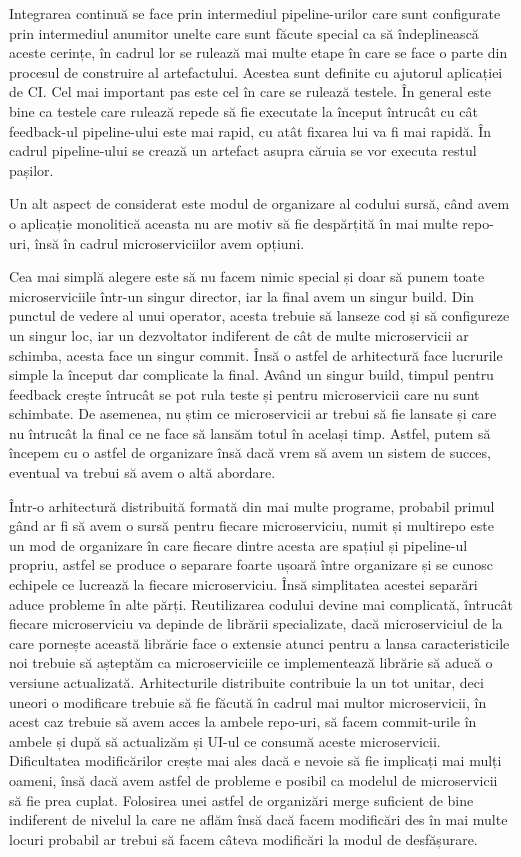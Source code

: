Integrarea continuă se face prin intermediul pipeline-urilor care sunt configurate prin 
intermediul anumitor unelte care sunt făcute special ca să îndeplinească aceste cerințe,
în cadrul lor se rulează mai multe etape în care se face o parte din procesul de construire al
artefactului. Acestea sunt definite cu ajutorul aplicației de CI. Cel mai important pas
este cel în care se rulează testele. În general este bine ca testele care rulează repede
să fie executate la început întrucât cu cât feedback-ul pipeline-ului este mai rapid, cu atât
fixarea lui va fi mai rapidă. În cadrul pipeline-ului se crează un artefact asupra căruia
se vor executa restul pașilor.

Un alt aspect de considerat este modul de organizare al codului sursă, când avem o aplicație
monolitică aceasta nu are motiv să fie despărțită în mai multe repo-uri, însă în cadrul microserviciilor
avem opțiuni.

Cea mai simplă alegere este să nu facem nimic special și doar să punem toate microserviciile
într-un singur director, iar la final avem un singur build. Din punctul de vedere al unui operator,
acesta trebuie să lanseze cod și să configureze un singur loc, iar un dezvoltator indiferent
de cât de multe microservicii ar schimba, acesta face un singur commit. Însă o astfel de arhitectură
face lucrurile simple la început dar complicate la final. Având un singur build, timpul pentru feedback
crește întrucât se pot rula teste și pentru microservicii care nu sunt schimbate. De asemenea,
nu știm ce microservicii ar trebui să fie lansate și care nu întrucât la final ce ne face
să lansăm totul în același timp. Astfel, putem să începem cu o astfel de organizare însă
dacă vrem să avem un sistem de succes, eventual va trebui să avem o altă abordare.

Într-o arhitectură distribuită formată din mai multe programe, probabil primul gând ar fi să
avem o sursă pentru fiecare microserviciu, numit și multirepo este un mod de organizare
în care fiecare dintre acesta are spațiul și pipeline-ul propriu, astfel se produce 
o separare foarte ușoară între organizare și se cunosc echipele ce lucrează la fiecare
microserviciu. Însă simplitatea acestei separări aduce probleme în alte părți. Reutilizarea
codului devine mai complicată, întrucât fiecare microserviciu va depinde de librării
specializate, dacă microserviciul de la care pornește această librărie face o extensie 
atunci pentru a lansa caracteristicile noi trebuie să așteptăm ca microserviciile ce implementează
librărie să aducă o versiune actualizată. Arhitecturile distribuite contribuie la un tot unitar,
deci uneori o modificare trebuie să fie făcută în cadrul mai multor microservicii, în acest caz
trebuie să avem acces la ambele repo-uri, să facem commit-urile în ambele și după să actualizăm
și UI-ul ce consumă aceste microservicii. Dificultatea modificărilor crește mai ales dacă
e nevoie să fie implicați mai mulți oameni, însă dacă avem astfel de probleme e posibil 
ca modelul de microservicii să fie prea cuplat. Folosirea unei astfel de organizări 
merge suficient de bine indiferent de nivelul la care ne aflăm însă dacă facem modificări
des în mai multe locuri probabil ar trebui să facem câteva modificări la modul de desfășurare.

